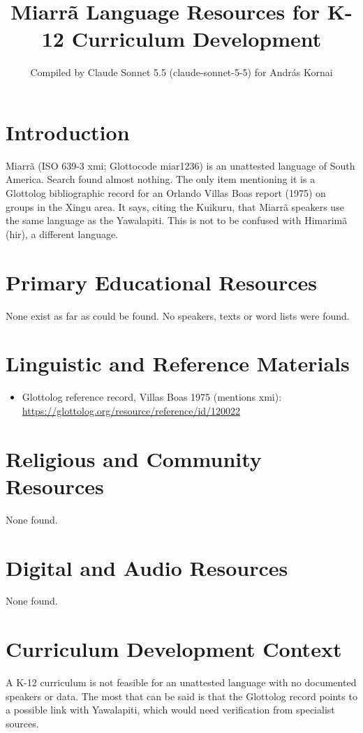 \documentclass[12pt]{article}
\title{Miarr\~a Language Resources for K-12 Curriculum Development}
\author{Compiled by Claude Sonnet 5.5 (claude-sonnet-5-5) for Andr\'as Kornai}
\date{}
\begin{document}
\maketitle

\section{Introduction}
Miarr\~a (ISO 639-3 xmi; Glottocode miar1236) is an unattested language of South America. Search found almost nothing. The only item mentioning it is a Glottolog bibliographic record for an Orlando Villas Boas report (1975) on groups in the Xingu area. It says, citing the Kuikuru, that Miarr\~a speakers use the same language as the Yawalapiti. This is not to be confused with Himarim\~a (hir), a different language.

\section{Primary Educational Resources}
None exist as far as could be found. No speakers, texts or word lists were found.

\section{Linguistic and Reference Materials}
\begin{itemize}
\item Glottolog reference record, Villas Boas 1975 (mentions xmi): \url{https://glottolog.org/resource/reference/id/120022}
\end{itemize}

\section{Religious and Community Resources}
None found.

\section{Digital and Audio Resources}
None found.

\section{Curriculum Development Context}
A K-12 curriculum is not feasible for an unattested language with no documented speakers or data. The most that can be said is that the Glottolog record points to a possible link with Yawalapiti, which would need verification from specialist sources.
\end{document}
